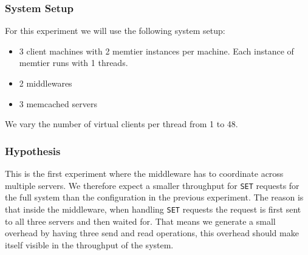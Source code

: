 \documentclass[11pt,a4paper]{article}
\begin{document}
\subsubsection{System Setup}
%
For this experiment we will use the following system setup:
%
\begin{itemize}
	\item 3 client machines with 2 memtier instances per machine. Each instance of memtier runs with 1 threads.
	\item 2 middlewares
	\item 3 memcached servers
\end{itemize}
%
We vary the number of virtual clients per thread from 1 to 48.
%
\subsubsection{Hypothesis}
%
This is the first experiment where the middleware has to coordinate across multiple servers.
%
We therefore expect a smaller throughput for \texttt{SET} requests for the full system than the configuration in the previous experiment.
%
The reason is that inside the middleware, when handling \texttt{SET} requests the request is first sent to all three servers and then waited for.
%
That means we generate a small overhead by having three send and read operations, this overhead should make itself visible in the throughput of the system.
%
\end{document}
